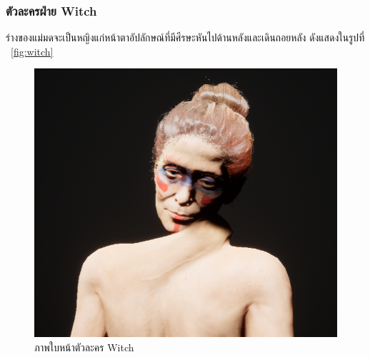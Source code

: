\subsubsection{ตัวละครฝ่าย Witch}

ร่างของแม่มดจะเป็นหญิงแก่หน้าตาอัปลักษณ์ที่มีศีรษะหันไปด้านหลังและเดินถอยหลัง ดังแสดงในรูปที่ ~\ref{fig:witch}

\begin{figure}
  \centering
  \begin{subcaptionblock}{.4\textwidth}
    \centering
    \includegraphics[width=.8\linewidth]{./img/characters/witch_face.png}
    \caption{ภาพใบหน้าตัวละคร Witch}\label{ภาพใบหน้าตัวละคร Witch}
  \end{subcaptionblock}%
  \begin{subcaptionblock}{.4\textwidth}
    \centering

\end{subcaptionblock}
\end{figure}
